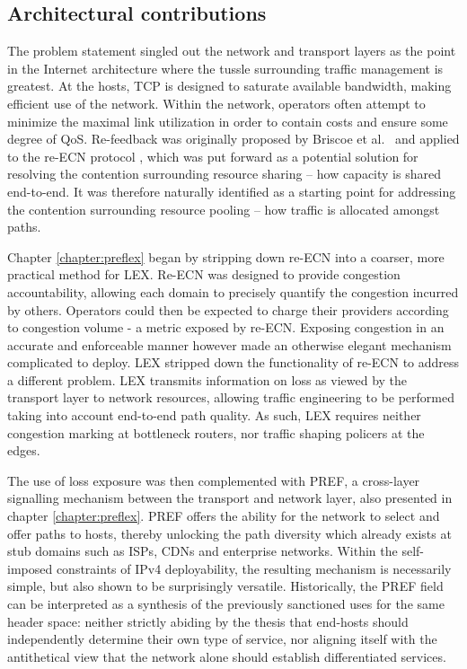 \subsection{Architectural contributions}

The problem statement singled out the network and transport layers as the point in the Internet architecture where the tussle surrounding traffic management is greatest.
At the hosts, \ac{TCP} is designed to saturate available bandwidth, making efficient use of the network.
Within the network, operators often attempt to minimize the maximal link utilization in order to contain costs and ensure some degree of \ac{QoS}.
Re-feedback was originally proposed by Briscoe et al.\ \cite{Briscoe:2005p346} and applied to the re-\ac{ECN} protocol \cite{Briscoe:2008p494}, which was put forward as a potential solution for resolving the contention surrounding resource sharing -- how capacity is shared end-to-end.
It was therefore naturally identified as a starting point for addressing the contention surrounding resource pooling -- how traffic is allocated amongst paths.

Chapter \ref{chapter:preflex} began by stripping down re-\ac{ECN} into a coarser, more practical method for \acf{LEX}.
Re-\ac{ECN} was designed to provide congestion accountability, allowing each domain to precisely quantify the congestion incurred by others.
Operators could then be expected to charge their providers according to congestion volume - a metric exposed by re-\ac{ECN}.
Exposing congestion in an accurate and enforceable manner however made an otherwise elegant mechanism complicated to deploy.
\ac{LEX} stripped down the functionality of re-\ac{ECN} to address a different problem.
\ac{LEX} transmits information on loss as viewed by the transport layer to network resources, allowing traffic engineering to be performed taking into account end-to-end path quality.
As such, \ac{LEX} requires neither congestion marking at bottleneck routers, nor traffic shaping policers at the edges.

The use of loss exposure was then complemented with \acf{PREF}, a cross-layer signalling mechanism between the transport and network layer, also presented in chapter \ref{chapter:preflex}.
\ac{PREF} offers the ability for the network to select and offer paths to hosts, thereby unlocking the path diversity which already exists at stub domains such as \acp{ISP}, \acp{CDN} and enterprise networks.
Within the self-imposed constraints of \ac{IPv4} deployability, the resulting mechanism is necessarily simple, but also shown to be surprisingly versatile.
Historically, the \ac{PREF} field can be interpreted as a synthesis of the previously sanctioned uses for the same header space: neither strictly abiding by the thesis that end-hosts should independently determine their own type of service, nor aligning itself with the antithetical view that the network alone should establish differentiated services.

